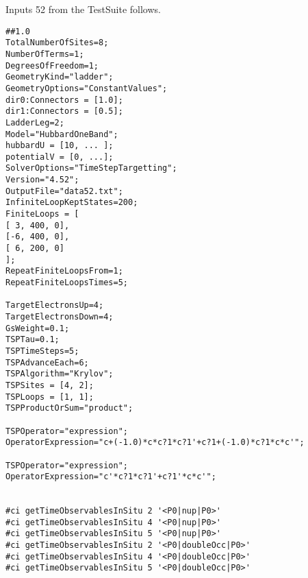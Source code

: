 \documentclass[twocolumn]{article}
\begin{document}
Inputs 52 from the TestSuite follows.
\begin{tiny}
\begin{verbatim}
##1.0
TotalNumberOfSites=8;
NumberOfTerms=1;
DegreesOfFreedom=1;
GeometryKind="ladder";
GeometryOptions="ConstantValues";
dir0:Connectors = [1.0];
dir1:Connectors = [0.5];
LadderLeg=2;
Model="HubbardOneBand";
hubbardU = [10, ... ];
potentialV = [0, ...];
SolverOptions="TimeStepTargetting";
Version="4.52";
OutputFile="data52.txt";
InfiniteLoopKeptStates=200;
FiniteLoops = [
[ 3, 400, 0],
[-6, 400, 0],
[ 6, 200, 0]
];
RepeatFiniteLoopsFrom=1;
RepeatFiniteLoopsTimes=5;

TargetElectronsUp=4;
TargetElectronsDown=4;
GsWeight=0.1;
TSPTau=0.1;
TSPTimeSteps=5;
TSPAdvanceEach=6;
TSPAlgorithm="Krylov";
TSPSites = [4, 2];
TSPLoops = [1, 1];
TSPProductOrSum="product";

TSPOperator="expression";
OperatorExpression="c+(-1.0)*c*c?1*c?1'+c?1+(-1.0)*c?1*c*c'";

TSPOperator="expression";
OperatorExpression="c'*c?1*c?1'+c?1'*c*c'";


#ci getTimeObservablesInSitu 2 '<P0|nup|P0>'
#ci getTimeObservablesInSitu 4 '<P0|nup|P0>'
#ci getTimeObservablesInSitu 5 '<P0|nup|P0>'
#ci getTimeObservablesInSitu 2 '<P0|doubleOcc|P0>'
#ci getTimeObservablesInSitu 4 '<P0|doubleOcc|P0>'
#ci getTimeObservablesInSitu 5 '<P0|doubleOcc|P0>'
\end{verbatim}
\end{tiny}
\end{document}

